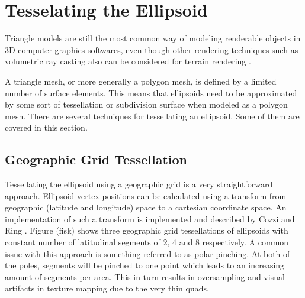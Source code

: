 \section{Tesselating the Ellipsoid}

Triangle models are still the most common way of modeling renderable objects in 3D computer graphics softwares, even though other rendering techniques such as volumetric ray casting also can be considered for terrain rendering \cite{cozzi11}.

A triangle mesh, or more generally a polygon mesh, is defined by a limited number of surface elements. This means that ellipsoids need to be approximated by some sort of tessellation or subdivision surface when modeled as a polygon mesh. There are several techniques for tessellating an ellipsoid. Some of them are covered in this section.

\subsection{Geographic Grid Tessellation}

Tessellating the ellipsoid using a geographic grid is a very straightforward approach. Ellipsoid vertex positions can be calculated using a transform from geographic (latitude and longitude) space to a cartesian coordinate space. An implementation of such a transform is implemented and described by Cozzi and Ring \cite[p. 25]{cozzi11}. Figure (fisk) shows three geographic grid tessellations of ellipsoids with constant number of latitudinal segments of 2, 4 and 8 respectively. A common issue with this approach is something referred to as polar pinching. At both of the poles, segments will be pinched to one point which leads to an increasing amount of segments per area. This in turn results in oversampling and visual artifacts in texture mapping due to the very thin quads.
